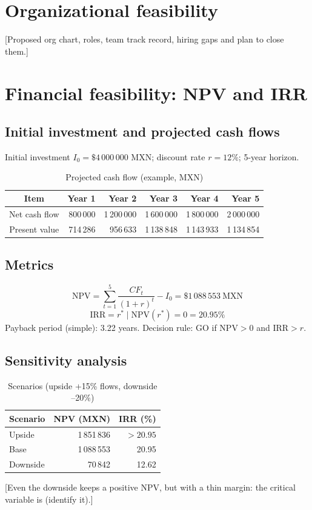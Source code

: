 \documentclass[12pt]{article}
\newcommand{\InversionInicial}{4\,000\,000}
\newcommand{\TasaDescuento}{12}
\newcommand{\VANbase}{1\,088\,553}
\newcommand{\TIRbase}{20.95}
\newcommand{\Payback}{3.22}
\newcommand{\VANoptimista}{1\,851\,836}
\newcommand{\VANpesimista}{70\,842}
\newcommand{\TIRpesimista}{12.62}
\newcommand{\Moneda}{MXN}
\begin{document}
\section{Organizational feasibility}
[Proposed org chart, roles, team track record, hiring gaps and plan to
close them.]

\section{Financial feasibility: NPV and IRR}
\subsection{Initial investment and projected cash flows}
Initial investment \(I_0 = \$\InversionInicial{}\) \Moneda{}; discount
rate \(r = \TasaDescuento{}\%\); 5-year horizon.
\begin{table}[h]
  \centering
  \caption{Projected cash flow (example, \Moneda{})}
  \label{tab:flujos}
  \begin{tabular}{crrrrr}
    \toprule
    Item & Year 1 & Year 2 & Year 3 & Year 4 & Year 5 \\
    \midrule
    Net cash flow & 800\,000 & 1\,200\,000 & 1\,600\,000 & 1\,800\,000 & 2\,000\,000 \\
    Present value & 714\,286 & 956\,633 & 1\,138\,848 & 1\,143\,933 & 1\,134\,854 \\
    \bottomrule
  \end{tabular}
\end{table}
\subsection{Metrics}
\begin{equation}
  \mathrm{NPV} = \sum_{t=1}^{5}\frac{CF_t}{(1+r)^t} - I_0
  = \$\VANbase{}\ \text{\Moneda{}}
  \label{eq:van}
\end{equation}
\begin{equation}
  \mathrm{IRR} = r^* \mid \mathrm{NPV}(r^*) = 0 = \TIRbase{}\%
  \label{eq:tir}
\end{equation}
Payback period (simple): \Payback{} years.
Decision rule: GO if \(\mathrm{NPV} > 0\) and \(\mathrm{IRR} > r\).
\subsection{Sensitivity analysis}
\begin{table}[h]
  \centering
  \caption{Scenarios (upside +15\% flows, downside --20\%)}
  \begin{tabular}{lrr}
    \toprule
    Scenario & NPV (\Moneda{}) & IRR (\%) \\
    \midrule
    Upside & \VANoptimista{} & $> \TIRbase{}$ \\
    Base & \VANbase{} & \TIRbase{} \\
    Downside & \VANpesimista{} & \TIRpesimista{} \\
    \bottomrule
  \end{tabular}
\end{table}
[Even the downside keeps a positive NPV, but with a thin margin: the
critical variable is (identify it).]
\end{document}
